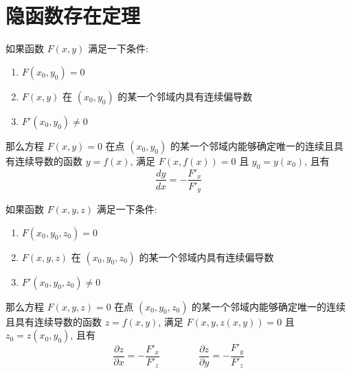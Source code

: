 \section{隐函数存在定理}

\begin{theorem}[隐函数存在定理 1]\label{the: 隐函数存在定理}
	如果函数 $F(x,y)$ 满足一下条件:
	\begin{enumerate}
		\item $F(x_{0},y_{0}) = 0$
		\item $F(x,y)$ 在 $(x_{0},y_{0})$ 的某一个邻域内具有连续偏导数
		\item $F'(x_{0},y_{0})\neq 0$
	\end{enumerate}
	那么方程 $F(x,y)=0$ 在点 $(x_{0},y_{0})$ 的某一个邻域内能够确定唯一的连续且具有连续导数的函数 $y=f(x)$, 满足 $F(x,f(x))=0$ 且 $y_{0} = y(x_{0})$, 且有
	$$\dfrac{dy}{dx} = -\dfrac{F'_{x}}{F'_{y}}$$
\end{theorem}
\begin{theorem}[隐函数存在定理 2]
	如果函数 $F(x,y,z)$ 满足一下条件:
	\begin{enumerate}
		\item $F(x_{0},y_{0},z_{0}) = 0$
		\item $F(x,y,z)$ 在 $(x_{0},y_{0},z_{0})$ 的某一个邻域内具有连续偏导数
		\item $F'(x_{0},y_{0},z_{0})\neq 0$
	\end{enumerate}
	那么方程 $F(x,y,z)=0$ 在点 $(x_{0},y_{0},z_{0})$ 的某一个邻域内能够确定唯一的连续且具有连续导数的函数 $z=f(x,y)$, 满足 $F(x,y,z(x,y))=0$ 且 $z_{0} = z(x_{0},y_{0})$, 且有
	$$\dfrac{\partial z}{\partial x} = -\dfrac{F'_{x}}{F'_{z}}\qquad\qquad \dfrac{\partial z}{\partial y} = -\dfrac{F'_{y}}{F'_{z}}$$
\end{theorem}
